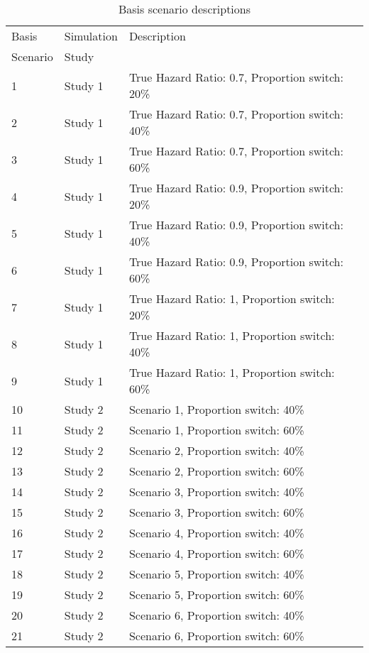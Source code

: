 \begin{table}
\caption{Basis scenario descriptions\label{T:chap_con:scenarios}}
\begin{tabular}{lll}
\hline
\hline
Basis    & Simulation  & Description  \\ 
Scenario & Study       &        \\
  \hline
 1 & Study 1 & True Hazard Ratio: 0.7, Proportion switch: 20\% \\ 
 2 & Study 1 & True Hazard Ratio: 0.7, Proportion switch: 40\% \\ 
 3 & Study 1 &  True Hazard Ratio: 0.7, Proportion switch: 60\% \\ 
 4 & Study 1 & True Hazard Ratio: 0.9, Proportion switch: 20\% \\ 
 5 & Study 1 & True Hazard Ratio: 0.9, Proportion switch: 40\% \\
 6 & Study 1 & True Hazard Ratio: 0.9, Proportion switch: 60\% \\ 
 7 & Study 1 & True Hazard Ratio: 1, Proportion switch: 20\% \\ 
 8 & Study 1 & True Hazard Ratio: 1, Proportion switch: 40\% \\ 
 9 & Study 1 &  True Hazard Ratio: 1, Proportion switch: 60\% \\ 
 \hline
 10  & Study 2 & Scenario 1, Proportion switch: 40\% \\ 
 11  & Study 2 & Scenario 1, Proportion switch: 60\% \\ 
 12  & Study 2 & Scenario 2, Proportion switch: 40\% \\ 
 13  & Study 2 & Scenario 2, Proportion switch: 60\% \\ 
 14 & Study 2 & Scenario 3, Proportion switch: 40\% \\ 
 15 & Study 2 & Scenario 3, Proportion switch: 60\% \\ 
 16 & Study 2 & Scenario 4, Proportion switch: 40\% \\ 
 17  & Study 2 & Scenario 4, Proportion switch: 60\% \\ 
 18  & Study 2 & Scenario 5, Proportion switch: 40\% \\ 
 19  & Study 2 & Scenario 5, Proportion switch: 60\% \\ 
 20  & Study 2 & Scenario 6, Proportion switch: 40\% \\ 
 21  & Study 2 & Scenario 6, Proportion switch: 60\% \\ 
\hline
\end{tabular}
\end{table}


